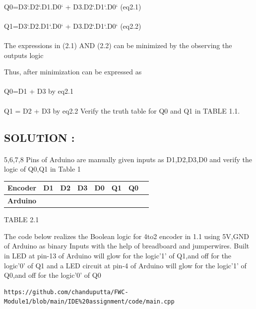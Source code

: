 \documentclass[10pt, a4paper]{article}
\begin{document}
\paragraph{}
{Q0=D3`.D2`.D1.D0` + D3.D2`.D1`.D0`                 (eq2.1)}
\paragraph{}
{Q1=D3`.D2.D1`.D0` + D3.D2`.D1`.D0`                          (eq2.2)}
 
 \paragraph{}
The expressions in (2.1) AND (2.2) can be minimized by the observing the outputs logic

Thus, after minimization  can
be expressed as
\paragraph{}
Q0=D1 + D3    by eq2.1
\paragraph{}  
Q1 = D2 + D3  by eq2.2
\hfill \break
Verify the truth table for Q0 and Q1 in TABLE 1.1.
\hfill \break

\subsection{SOLUTION :}

\paragraph{}
5,6,7,8 Pins of Arduino are manually given inputs as D1,D2,D3,D0 and verify the logic of Q0,Q1 in Table 1

\begin{tabularx}{0.60\textwidth} { 
  | >{\centering\arraybackslash}X 
  | >{\centering\arraybackslash}X 
  | >{\centering\arraybackslash}X 
  | >{\centering\arraybackslash}X 
  | >{\centering\arraybackslash}X 
  | >{\centering\arraybackslash}X
  | >{\centering\arraybackslash}X
  | >{\centering\arraybackslash}X|}

\hline
 \textbf{Encoder} & D1 & D2 & D3 & D0 & Q1 & Q0 \\
\hline
\textbf{Arduino} & 5 & 6 & 7 & 8 & 13 & 4 \\  
\hline
\end{tabularx}
 
\begin{center}
TABLE 2.1
\end{center}

The code below realizes the Boolean logic for 4to2 encoder in 1.1  using 5V,GND of Arduino as binary Inputs with the help of breadboard and jumperwires.
Built in LED at pin-13 of Arduino will glow for the logic'1' of Q1,and off for the logic'0' of Q1  and a LED circuit at pin-4 of Arduino will glow for the logic'1' of Q0,and off for the logic'0' of Q0
\begin{lstlisting}
https://github.com/chanduputta/FWC-Module1/blob/main/IDE%20assignment/code/main.cpp
\end{lstlisting}

\end{document}
